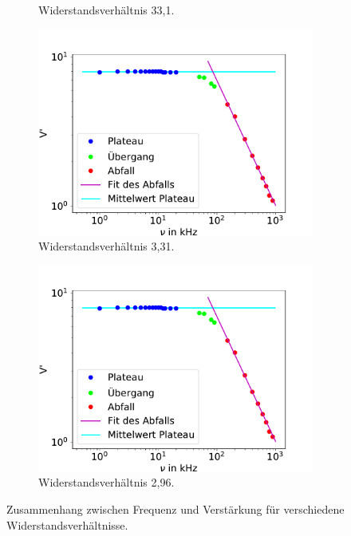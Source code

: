 \begin{figure}
\begin{subfigure}{0.48\textwidth}
                        \caption{Widerstandsverhältnis 33,1.}
                        \label{fig:TU}
                    \end{subfigure}
                    \begin{subfigure}{0.48\textwidth}
                        \centering
                        \includegraphics[width=\textwidth]{verhaeltnis1.pdf}%
                        \caption{Widerstandsverhältnis 3,31.}
                        \label{fig:TU}
                    \end{subfigure}
                    \begin{subfigure}{0.48\textwidth}
                        \centering
                        \includegraphics[width=\textwidth]{verhaeltnis1.pdf}%
                        \caption{Widerstandsverhältnis 2,96.}
                        \label{fig:TU}
                    \end{subfigure}
                    \caption{Zusammenhang zwischen Frequenz und Verstärkung für verschiedene Widerstandsverhältnisse.}
                    \label{fig:plateaus}
                \end{figure}


